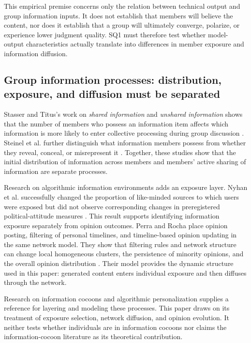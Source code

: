 \documentclass[11pt,a4paper]{article}
\newcommand{\term}[1]{\textit{#1}}
\begin{document}
This empirical premise concerns only the relation between technical output and group information inputs. It does not establish that members will believe the content, nor does it establish that a group will ultimately converge, polarize, or experience lower judgment quality. SQ1 must therefore test whether model-output characteristics actually translate into differences in member exposure and information diffusion.

\subsection{Group information processes: distribution, exposure, and diffusion must be separated}

Stasser and Titus's work on \term{shared information} and \term{unshared information} shows that the number of members who possess an information item affects which information is more likely to enter collective processing during group discussion \cite{stasser1985}. Steinel et al. further distinguish what information members possess from whether they reveal, conceal, or misrepresent it \cite{steinel2010}. Together, these studies show that the initial distribution of information across members and members' active sharing of information are separate processes.

Research on algorithmic information environments adds an exposure layer. Nyhan et al. successfully changed the proportion of like-minded sources to which users were exposed but did not observe corresponding changes in preregistered political-attitude measures \cite{nyhan2023}. This result supports identifying information exposure separately from opinion outcomes. Perra and Rocha place opinion posting, filtering of personal timelines, and timeline-based opinion updating in the same network model. They show that filtering rules and network structure can change local homogeneous clusters, the persistence of minority opinions, and the overall opinion distribution \cite{perra2019}. Their model provides the dynamic structure used in this paper: generated content enters individual exposure and then diffuses through the network.

Research on information cocoons and algorithmic personalization supplies a reference for layering and modeling these processes. This paper draws on its treatment of exposure selection, network diffusion, and opinion evolution. It neither tests whether individuals are in information cocoons nor claims the information-cocoon literature as its theoretical contribution.
\end{document}
